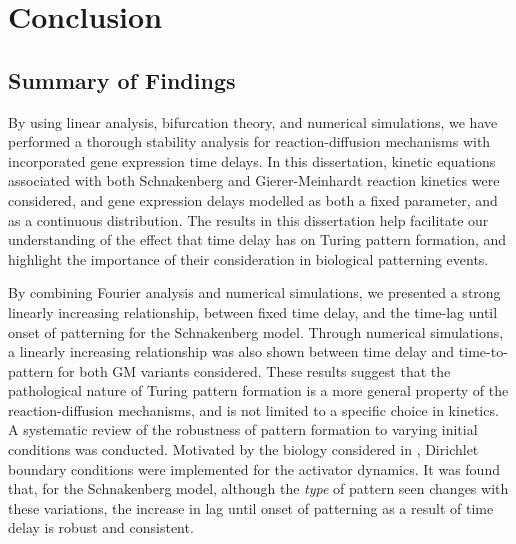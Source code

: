 \chapter{Conclusion}
\section{Summary of Findings}
By using linear analysis, bifurcation theory, and numerical simulations, we have performed a thorough stability analysis for reaction-diffusion mechanisms with incorporated gene expression time delays. In this dissertation, kinetic equations associated with both Schnakenberg and Gierer-Meinhardt reaction kinetics were considered, and gene expression delays modelled as both a fixed parameter, and as a continuous distribution. The results in this dissertation help facilitate our understanding of the effect that time delay has on Turing pattern formation, and highlight the importance of their consideration in biological patterning events.

By combining Fourier analysis and numerical simulations, we presented a strong linearly increasing relationship, between fixed time delay, and the time-lag until onset of patterning for the Schnakenberg model. Through numerical simulations, a linearly increasing relationship was also shown between time delay and time-to-pattern for both GM variants considered. These results suggest that the pathological nature of Turing pattern formation is a more general property of the reaction-diffusion mechanisms, and is not limited to a specific choice in kinetics. A systematic review of the robustness of pattern formation to varying initial conditions was conducted. Motivated by the biology considered in \cite{krausemixed}, Dirichlet boundary conditions were implemented for the activator dynamics. It was found that, for the Schnakenberg model, although the \textit{type} of pattern seen changes with these variations, the increase in lag until onset of patterning as a result of time delay is robust and consistent.

